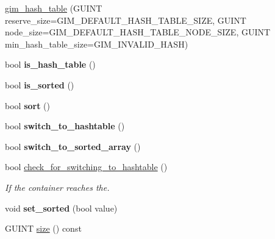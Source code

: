 \begin{DoxyCompactItemize}
\hyperlink{classgim__hash__table_aefe21c907c69c8077ec0886aaa778f6f}{gim\+\_\+hash\+\_\+table} (G\+U\+I\+NT reserve\+\_\+size=G\+I\+M\+\_\+\+D\+E\+F\+A\+U\+L\+T\+\_\+\+H\+A\+S\+H\+\_\+\+T\+A\+B\+L\+E\+\_\+\+S\+I\+ZE, G\+U\+I\+NT node\+\_\+size=G\+I\+M\+\_\+\+D\+E\+F\+A\+U\+L\+T\+\_\+\+H\+A\+S\+H\+\_\+\+T\+A\+B\+L\+E\+\_\+\+N\+O\+D\+E\+\_\+\+S\+I\+ZE, G\+U\+I\+NT min\+\_\+hash\+\_\+table\+\_\+size=G\+I\+M\+\_\+\+I\+N\+V\+A\+L\+I\+D\+\_\+\+H\+A\+SH)
\item 
\mbox{\label{classgim__hash__table_ab7ab2e3e9ac09ec98d5c7112ea092aad}} 
bool {\bfseries is\+\_\+hash\+\_\+table} ()
\item 
\mbox{\label{classgim__hash__table_a075a9857030ef2630d036b57778e2a46}} 
bool {\bfseries is\+\_\+sorted} ()
\item 
\mbox{\label{classgim__hash__table_adc65cdfbdb6906e4d0ebf66766f65557}} 
bool {\bfseries sort} ()
\item 
\mbox{\label{classgim__hash__table_a02b51868862156240818dafe2f8df01d}} 
bool {\bfseries switch\+\_\+to\+\_\+hashtable} ()
\item 
\mbox{\label{classgim__hash__table_acf8117de90e6486e712fc6184ea40225}} 
bool {\bfseries switch\+\_\+to\+\_\+sorted\+\_\+array} ()
\item 
\mbox{\label{classgim__hash__table_aba33eeb9b5aa00b0d8a002c549b71ed3}} 
bool \hyperlink{classgim__hash__table_aba33eeb9b5aa00b0d8a002c549b71ed3}{check\+\_\+for\+\_\+switching\+\_\+to\+\_\+hashtable} ()
\begin{DoxyCompactList}\small\item\em If the container reaches the. \end{DoxyCompactList}\item 
\mbox{\label{classgim__hash__table_abe1662ebb0f7a17a84e7fc5d0f993c58}} 
void {\bfseries set\+\_\+sorted} (bool value)
\item 
\mbox{\label{classgim__hash__table_a77994868ac8519736e69c93c1c989dde}} 
G\+U\+I\+NT \hyperlink{classgim__hash__table_a77994868ac8519736e69c93c1c989dde}{size} () const

\end{DoxyCompactItemize}
